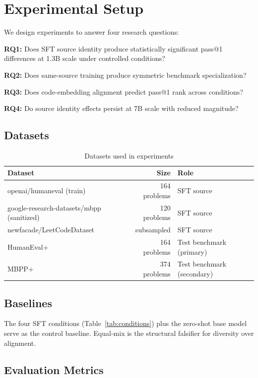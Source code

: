 \section{Experimental Setup}
\label{sec:setup}

We design experiments to answer four research questions:

\textbf{RQ1:} Does SFT source identity produce statistically significant pass@1 differences at 1.3B scale under controlled conditions?

\textbf{RQ2:} Does same-source training produce symmetric benchmark specialization?

\textbf{RQ3:} Does code-embedding alignment predict pass@1 rank across conditions?

\textbf{RQ4:} Do source identity effects persist at 7B scale with reduced magnitude?

\subsection{Datasets}

\begin{table}[h]
\centering
\caption{Datasets used in experiments}
\label{tab:datasets}
\begin{tabular}{lrl}
\toprule
Dataset & Size & Role \\
\midrule
openai/humaneval (train) & 164 problems & SFT source \\
google-research-datasets/mbpp (sanitized) & 120 problems & SFT source \\
newfacade/LeetCodeDataset & subsampled & SFT source \\
HumanEval+ & 164 problems & Test benchmark (primary) \\
MBPP+ & 374 problems & Test benchmark (secondary) \\
\bottomrule
\end{tabular}
\end{table}

\subsection{Baselines}

The four SFT conditions (Table~\ref{tab:conditions}) plus the zero-shot base model serve as the control
baseline. Equal-mix is the structural falsifier for diversity over alignment.

\subsection{Evaluation Metrics}

